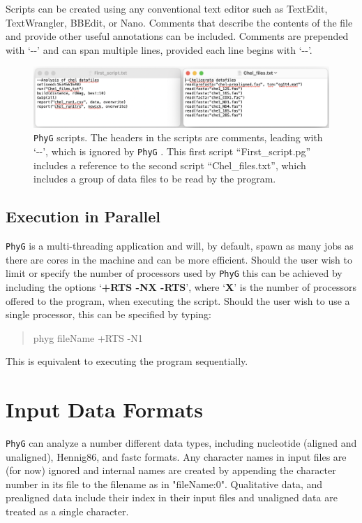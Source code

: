 \documentclass[11pt]{book}
\newcommand{\phyg}{\texttt{PhyG} }
\begin{document}
{{		Scripts can be created using any conventional text editor such as TextEdit, TextWrangler, 
		BBEdit, or Nano. Comments that describe the contents of the file and provide other useful 
		annotations can be included. Comments are prepended with `-{}-' and can span multiple 
		lines, provided each line begins with `-{}-'. 

		\begin{figure}[H]
		\centering
		\includegraphics[width=\textwidth]{First_run.jpg}
		\caption{\phyg scripts. The headers in the scripts are comments, leading with `-{}-', which is 
		ignored by \phyg. This first script ``First\_script.pg'' includes a reference to the second script
		``Chel\_files.txt'', which includes a group of data files to be read by the program.}
		\label{firstscript}
		\end{figure}
	
	\subsection{Execution in Parallel}
		\label{subsec:parallel}
		\phyg is a multi-threading application and will, by default, spawn as many jobs as there 
		are cores in the machine and can be more efficient. Should the user wish to limit or 
		specify the number of processors used by \phyg this can be achieved by including the 
		options `\textbf{+RTS -NX -RTS}', where `\textbf{X}' is the number of processors offered 
		to the program, when executing the script. Should the user wish to use a single processor, 
		this can be specified by typing:

		\begin{quote}
		phyg fileName +RTS -N1 
		\end{quote}
		
		\noindent This is equivalent to executing the program sequentially.		

		
\section{Input Data Formats} 
	\phyg can analyze a number different data types, including nucleotide 
	(aligned and unaligned), Hennig86, and fastc formats.
	Any character names in input files are (for now) ignored and internal names are created
	by appending the character number in its file to the filename as in "fileName:0".
	Qualitative data, and prealigned data include their index in their input files and unaligned 
	data are treated as a single character.
		
}}
\end{document}
